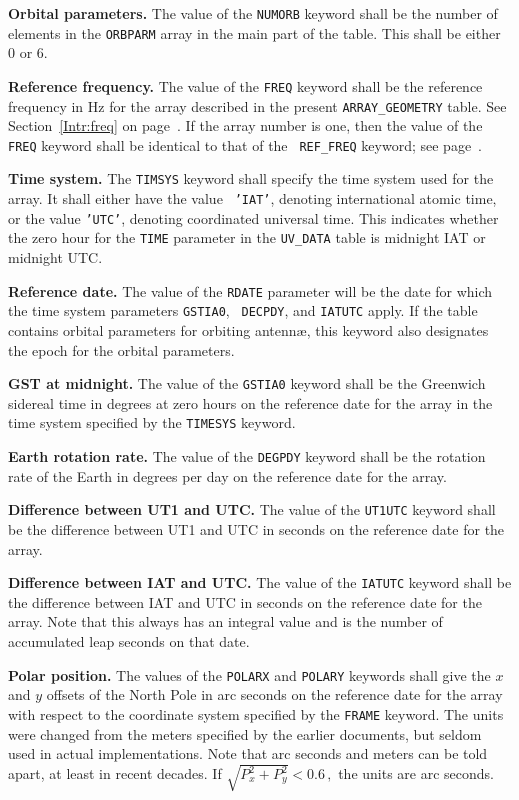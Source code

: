 \documentclass[twoside]{article}
\newcommand{\Hi}[1]{\textcolor{hicol}{#1}}
\begin{document}
{\bf Orbital parameters.} The value of the {\tt NUMORB} keyword shall
be the number of elements in the {\tt ORBPARM} array in the main part
of the table.  This shall be either 0 or 6.

{\bf Reference frequency.} The value of the {\tt FREQ} keyword shall be
the reference frequency in Hz for the array described in the present
{\tt ARRAY\_GEOMETRY} table.  See Section~\ref{Intr:freq} on
page~\pageref{Intr:freq}.  If the array number is one, then the value
of the {\tt FREQ} keyword shall be identical to that of the {\tt
  REF\_FREQ} keyword; see page~\pageref{ta:keywords}.

{\bf Time system.} The {\tt TIMSYS} keyword shall specify the time
system used for the array.  It shall either have the value {\tt
'IAT'}, denoting international atomic time, or the value {\tt 'UTC'},
denoting coordinated universal time.  This indicates whether the zero
hour for the {\tt TIME} parameter in the {\tt UV\_DATA} table is
midnight IAT or midnight UTC\@.

{\bf Reference date.} The value of the {\tt RDATE} parameter will be
the date for which the time system parameters {\tt GSTIA0}, {\tt
DECPDY}, and {\tt IATUTC} apply.  If the table contains orbital
parameters for orbiting antenn\ae, this keyword also designates the
epoch for the orbital parameters.

{\bf GST at midnight.} The value of the {\tt GSTIA0} keyword shall be
the Greenwich sidereal time in degrees at zero hours on the reference
date for the array in the  time system specified by the {\tt TIMESYS}
keyword.

{\bf Earth rotation rate.} The value of the {\tt DEGPDY} keyword shall
be the rotation rate of the Earth in degrees per day on the reference
date for the array.

{\bf Difference between UT1 and UTC\@.} The value of the {\tt UT1UTC}
keyword shall be the difference between UT1 and UTC in seconds on the
reference date for the array.

{\bf Difference between IAT and UTC\@.} The value of the {\tt IATUTC}
keyword shall be the difference between IAT and UTC in seconds on the
reference date for the array.  Note that this always has an integral
value and is the number of accumulated leap seconds on that date.

{\bf Polar position.} The values of the {\tt POLARX} and {\tt POLARY}
keywords shall give the $x$ and $y$ offsets of the North Pole in
\Hi{arc seconds} on the reference date for the array with respect to
the coordinate system specified by the {\tt FRAME} keyword.  \Hi{The
units were changed from the meters specified by the earlier documents,
but seldom used in actual implementations.  Note that arc seconds and
meters can be told apart, at least in recent decades.  If $\sqrt{P_x^2
  + P_y^2} < 0.6\, ,$ the units are arc seconds.}
\end{document}
